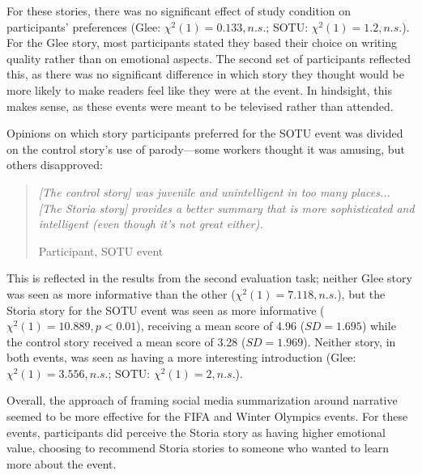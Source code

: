 For these stories, there was no significant effect of study condition on participants' preferences (Glee: $\chi^2(1)=0.133, n.s.$; SOTU: $\chi^2(1)=1.2, n.s.$). For the Glee story, most participants stated they based their choice on writing quality rather than on emotional aspects. The second set of participants reflected this, as there was no significant difference in which story they thought would be more likely to make readers feel like they were at the event. In hindsight, this makes sense, as these events were meant to be televised rather than attended.

Opinions on which story participants preferred for the SOTU event was divided on the control story's use of parody---some workers thought it was amusing, but others disapproved:

\begin{quote}
\emph{[The control story] was juvenile and unintelligent in too many places... [The Storia story] provides a better summary that is more sophisticated and intelligent (even though it's not great either).}

Participant, SOTU event
\end{quote}

This is reflected in the results from the second evaluation task; neither Glee story was seen as more informative than the other ($\chi^2(1)=7.118, n.s.$), but the Storia story for the SOTU event was seen as more informative ($\chi^2(1)=10.889, p<0.01$), receiving a mean score of 4.96 ($SD=1.695$) while the control story received a mean score of 3.28 ($SD=1.969$). Neither story, in both events, was seen as having a more interesting introduction (Glee: $\chi^2(1)=3.556, n.s.$; SOTU: $\chi^2(1)=2, n.s.$). 







Overall, the approach of framing social media summarization around narrative seemed to be more effective for the FIFA and Winter Olympics events. For these events, participants did perceive the Storia story as having higher emotional value, choosing to recommend Storia stories to someone who wanted to learn more about the event.